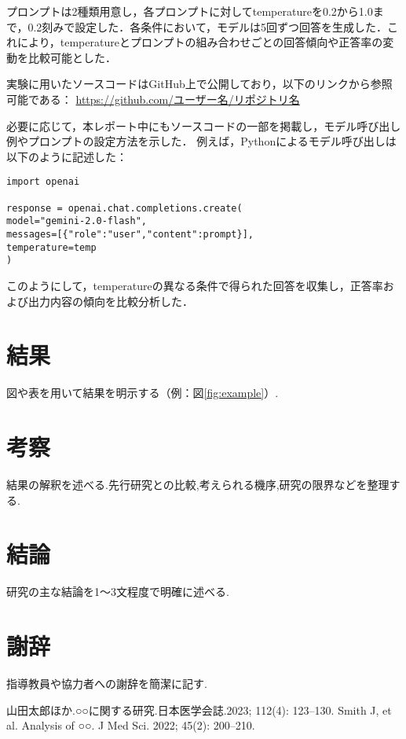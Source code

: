 \documentclass[a4paper,11pt]{jsarticle}
\begin{document}
プロンプトは2種類用意し，各プロンプトに対してtemperatureを0.2から1.0まで，0.2刻みで設定した．各条件において，モデルは5回ずつ回答を生成した．これにより，temperatureとプロンプトの組み合わせごとの回答傾向や正答率の変動を比較可能とした．

実験に用いたソースコードはGitHub上で公開しており，以下のリンクから参照可能である：
\url{https://github.com/ユーザー名/リポジトリ名}

必要に応じて，本レポート中にもソースコードの一部を掲載し，モデル呼び出し例やプロンプトの設定方法を示した．
例えば，Pythonによるモデル呼び出しは以下のように記述した：

\begin{verbatim}
import openai

response = openai.chat.completions.create(
model="gemini-2.0-flash",
messages=[{"role":"user","content":prompt}],
temperature=temp
)
\end{verbatim}

このようにして，temperatureの異なる条件で得られた回答を収集し，正答率および出力内容の傾向を比較分析した．

\section{結果}
図や表を用いて結果を明示する（例：図\ref{fig:example}）.

\section{考察}
結果の解釈を述べる.先行研究との比較,考えられる機序,研究の限界などを整理する.

\section{結論}
研究の主な結論を1～3文程度で明確に述べる.

\section*{謝辞}
指導教員や協力者への謝辞を簡潔に記す.

\begin{thebibliography}{9}
 山田太郎ほか.○○に関する研究.日本医学会誌.2023; 112(4): 123–130.
 Smith J, et al. Analysis of ○○. J Med Sci. 2022; 45(2): 200–210.
\end{thebibliography}
\end{document}
